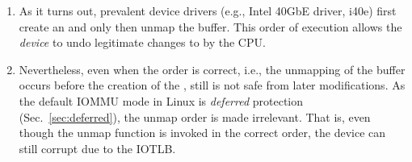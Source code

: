 \begin{enumerate}[label=(\roman*),wide, labelwidth=!, labelindent=0pt]

\item As it turns out, prevalent device drivers (e.g., Intel 40GbE driver, i40e) first create an \skb{} and only then unmap the buffer. This order of execution allows the \emph{device} to undo legitimate changes to \shinfo{} by the CPU. 

\item Nevertheless, even when the order is correct, i.e., the unmapping of the buffer occurs before the creation of the \skb{}, still \shinfo{} is not safe from later modifications. As the default IOMMU mode in Linux is \emph{deferred} protection (Sec.~\ref{sec:deferred}), the unmap order is made irrelevant. That is, even though the unmap function is invoked in the correct order, the device can still corrupt \shinfo{} due to the IOTLB.  


\end{enumerate}
